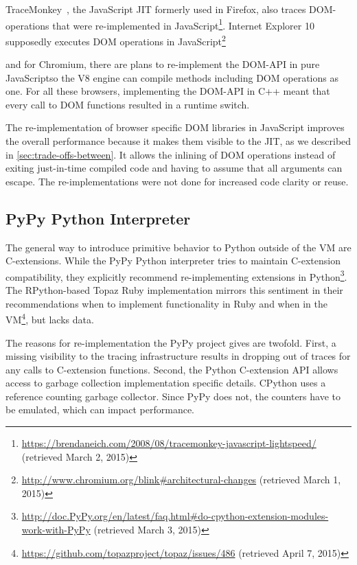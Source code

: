 \documentclass[
10pt,          %
]{sigplanconf}
\begin{document}
TraceMonkey~\cite{GalTypeSpecialization}, the JavaScript \ac{JIT}
formerly used in Firefox, also traces \ac{DOM}-operations that were
re-implemented in
JavaScript\footnote{\url{https://brendaneich.com/2008/08/tracemonkey-javascript-lightspeed/}
  (retrieved March 2, 2015)}. Internet Explorer 10 supposedly executes
\ac{DOM} operations in
JavaScript\footnote{\RaggedRight \url{http://www.chromium.org/blink\#architectural-changes}
  (retrieved March 1,
  2015)}\addtocounter{footnote}{-1}\addtocounter{Hfootnote}{-1} and
for Chromium, there are plans to re-implement the \ac{DOM}-\ac{API} in
pure JavaScript\footnotemark so the V8 engine can compile methods
including \ac{DOM} operations as one. For all these browsers,
implementing the \ac{DOM}-\ac{API} in C++ meant that every call to
\ac{DOM} functions resulted in a runtime switch.

The re-implementation of browser specific \ac{DOM} libraries in JavaScript
improves the overall performance because it makes them visible to the
\ac{JIT}, as we described in \autoref{sec:trade-offs-between}. It allows
the inlining of \ac{DOM} operations instead of exiting just-in-time
compiled code and having to assume that all arguments can escape. The
re-implementations were not done for increased code clarity or reuse.

\subsection{PyPy Python Interpreter}
The general way to introduce primitive behavior to Python outside of
the \ac{VM} are C-extensions. While the PyPy Python interpreter tries to
maintain C-extension compatibility, they explicitly recommend
re-implementing extensions in
Python\footnote{\RaggedRight \url{http://doc.PyPy.org/en/latest/faq.html\#do-cpython-extension-modules-work-with-PyPy}
  (retrieved March 3, 2015)}. The RPython-based Topaz Ruby
implementation mirrors this sentiment in their recommendations when to
implement functionality in Ruby and when in the
\ac{VM}\footnote{\url{https://github.com/topazproject/topaz/issues/486}
  (retrieved April 7, 2015)}, but lacks data.

The reasons for re-implementation the PyPy project gives are
twofold. First, a missing visibility to the tracing infrastructure
results in dropping out of traces for any calls to C-extension
functions. Second, the Python C-extension \ac{API} allows access to garbage
collection implementation specific details. CPython uses a reference
counting garbage collector. Since PyPy does not, the counters have to
be emulated, which can impact performance.
\end{document}
